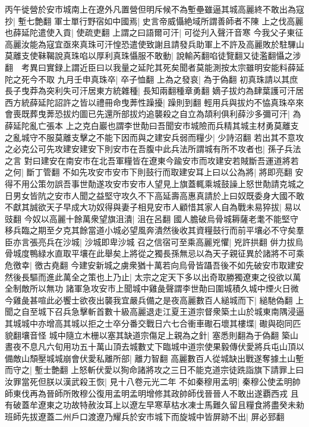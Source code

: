 丙午徙營於安市城南上在遼外凡置營但明斥候不為塹壘雖逼其城高麗終不敢出為寇抄|{
	塹七艶翻}
軍士單行野宿如中國焉|{
	史言帝威懾絶域所謂善師者不陳}
上之伐高麗也薛延陀遣使入貢|{
	使疏吏翻}
上謂之曰語爾可汗|{
	可從刋入聲汗音寒}
今我父子東征高麗汝能為寇宜亟來真珠可汗惶恐遣使致謝且請發兵助軍上不許及高麗敗於駐驆山莫離支使靺鞨說真珠啗以厚利真珠懾服不敢動|{
	說輸芮翻啗徒覽翻又徒濫翻懾之涉翻　考異曰實録上謂近臣曰以我量之延陀其死矣聞者莫能測按太宗雖明安能料薛延陀之死今不取}
九月壬申真珠卒|{
	卒子恤翻}
上為之發哀|{
	為于偽翻}
初真珠請以其庶長子曳莽為突利失可汗居東方統雜種|{
	長知兩翻種章勇翻}
嫡子拔灼為肆葉護可汗居西方統薛延陀詔許之皆以禮冊命曳莾性躁擾|{
	躁則到翻}
輕用兵與拔灼不恊真珠卒來會喪既葬曳莾恐拔灼圖已先還所部拔灼追襲殺之自立為頡利俱利薛沙多彌可汗|{
	為薛延陀亂亡張本}
上之克白巖也謂李世勣曰吾聞安市城險而兵精其城主材勇莫離支之亂城守不服莫離支擊之不能下因而與之建安兵弱而糧少|{
	少詩沼翻}
若出其不意攻之必克公可先攻建安建安下則安市在吾腹中此兵法所謂城有所不攻者也|{
	孫子兵法之言}
對曰建安在南安市在北吾軍糧皆在遼東今踰安市而攻建安若賊斷吾運道將若之何|{
	斷丁管翻}
不如先攻安市安市下則鼓行而取建安耳上曰以公為將|{
	將即亮翻}
安得不用公策勿誤吾事世勣遂攻安市安市人望見上旗蓋輒乘城鼓譟上怒世勣請克城之日男女皆阬之安市人聞之益堅守攻久不下高延壽高惠真請於上曰奴既委身大國不敢不獻其誠欲天子早成大功奴得與妻子相見安市人顧惜其家人自為戰未易猝拔|{
	易以豉翻}
今奴以高麗十餘萬衆望旗沮潰|{
	沮在呂翻}
國人膽破烏骨城耨薩老耄不能堅守移兵臨之期至夕克其餘當道小城必望風奔潰然後收其資糧鼓行而前平壤必不守矣羣臣亦言張亮兵在沙城|{
	沙城即卑沙城}
召之信宿可至乘高麗兇懼|{
	兇許拱翻}
倂力拔烏骨城度鴨緑水直取平壤在此舉矣上將從之獨長孫無忌以為天子親征異於諸將不可乘危徼幸|{
	徼古堯翻}
今建安新城之虜衆猶十萬若向烏骨皆躡吾後不如先破安市取建安然後長驅而進此萬全之策也上乃止|{
	太宗之定天下多以出奇取勝獨遼東之役欲以萬全制敵所以無功}
諸軍急攻安市上聞城中雞彘聲謂李世勣曰圍城積久城中煙火日微今雞彘甚喧此必饗士欲夜出襲我宜嚴兵備之是夜高麗數百人縋城而下|{
	縋馳偽翻}
上聞之自至城下召兵急擊斬首數十級高麗退走江夏王道宗督衆築土山於城東南隅浸逼其城城中亦增高其城以拒之士卒分番交戰日六七合衝車礮石壞其樓堞|{
	礮與砲同匹貌翻壤音怪}
城中隨立木栅以塞其缺道宗傷足上親為之針|{
	塞悉則翻為于偽翻}
築山晝夜不息凡六旬用功五十萬山頂去城數丈下臨城中道宗使果毅傳伏愛將兵屯山頂以備敵山頹壓城城崩會伏愛私離所部|{
	離力智翻}
高麗數百人從城缺出戰遂奪據土山塹而守之|{
	塹士艶翻}
上怒斬伏愛以狥命諸將攻之三日不能克道宗徒跣詣旗下請罪上曰汝罪當死但朕以漢武殺王恢|{
	見十八卷元光二年}
不如秦穆用孟明|{
	秦穆公使孟明帥師東伐再為晉師所敗穆公復用孟明孟明增修其政帥師伐晉晉人不敢出遂覇西戎}
且有破蓋牟遼東之功故特赦汝耳上以遼左早寒草枯水凍士馬難久留且糧食將盡癸未勑班師先拔遼蓋二州戶口渡遼乃耀兵於安市城下而旋城中皆屏跡不出|{
	屏必郅翻}
